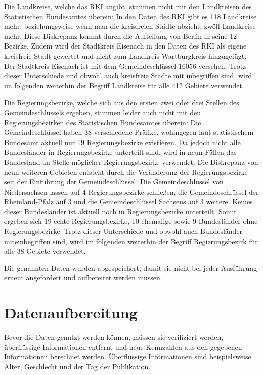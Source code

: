Die Landkreise, welche das RKI angibt, stimmen nicht mit den Landkreisen des Statistischen Bundesamtes  \autocite{statistischesBundesamtLandkreise}
überein: In den Daten des RKI gibt es 118 Landkreise mehr, beziehungsweise wenn man die kreisfreien Städte abzieht, zwölf Landkreise mehr. Diese Diskrepanz kommt durch die Aufteilung von Berlin in seine 12 Bezirke. Zudem wird der Stadtkreis Eisenach in den Daten des RKI als eigene kreisfreie Stadt gewertet und nicht zum Landkreis Wartburgkreis hinzugefügt. Der Stadtkreis Eisenach ist mit dem Gemeindeschlüssel 16056 versehen. Trotz dieser Unterschiede und obwohl auch kreisfreie Städte mit inbegriffen sind, wird im folgenden weiterhin der Begriff \glqq{}Landkreise\grqq{} für alle 412 Gebiete verwendet.


Die Regierungsbezirke, welche sich aus den ersten zwei oder drei Stellen des Gemeindeschlüssels ergeben, stimmen leider auch nicht mit den Regierungsbezirken des Statistischen Bundesamtes
\autocite{statistischesBundesamtRegierungsbezirke}
überein: Die Gemeindeschlüssel haben 38 verschiedene Präfixe, wohingegen laut statistischem Bundesamt aktuell nur 19 Regierungsbezirke existieren.
Da jedoch nicht alle Bundesländer in Regierungsbezirke unterteilt sind, wird in neun Fällen das Bundesland an Stelle möglicher Regierungsbezirke verwendet. Die Diskrepanz von neun weiteren Gebieten entsteht durch die Veränderung der Regierungsbezirke seit der Einführung der Gemeindeschlüssel: Die Gemeindeschlüssel von Niedersachsen lassen auf 4 Regierungsbezirke schließen, die Gemeindeschlüssel der Rheinland-Pfalz auf 3 und die Gemeindeschlüssel Sachsens auf 3 weitere. Keines dieser Bundesländer ist aktuell noch in Regierungsbezirke unterteilt. Somit ergeben sich 19 echte Regierungsbezirke, 10 ehemalige sowie 9 Bundesländer ohne Regierungsbezirke.
Trotz dieser Unterschiede und obwohl auch Bundesländer miteinbegriffen sind, wird im folgenden weiterhin der Begriff \glqq{}Regierungsbezirk\grqq{} für alle 38 Gebiete verwendet.

Die genannten Daten wurden abgespeichert, damit sie nicht bei jeder Ausführung erneut angefordert und aufbereitet werden müssen.
\section{Datenaufbereitung}
Bevor die Daten genutzt werden können, müssen sie verifiziert werden, überflüssige Informationen entfernt und neue Kennzahlen aus den gegebenen Informationen berechnet werden. Überflüssige Informationen sind beispielsweise Alter, Geschlecht und der Tag der Publikation.

